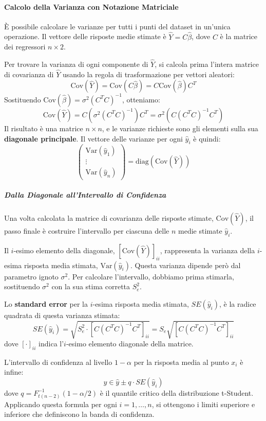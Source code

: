 \paragraph{Calcolo della Varianza con Notazione Matriciale}
È possibile calcolare le varianze per tutti i punti del dataset in un'unica
operazione. Il vettore delle risposte medie stimate è \(\hat{Y} = C
\hat{\beta}\), dove \(C\) è la matrice dei regressori \(n \times 2\).

Per trovare la varianza di ogni componente di \(\hat{Y}\), si calcola prima
l'intera matrice di covarianza di \(\hat{Y}\) usando la regola di trasformazione
per vettori aleatori:
\[
	\text{Cov}(\hat{Y}) = \text{Cov}(C \hat{\beta}) = C \text{Cov}(\hat{\beta})
	C^T
\]
Sostituendo \(\text{Cov}(\hat{\beta}) = \sigma^2 (C^T C)^{-1}\), otteniamo:
\[
	\text{Cov}(\hat{Y}) = C \left( \sigma^2 (C^T C)^{-1} \right) C^T = \sigma^2
	\left( C (C^T C)^{-1} C^T \right)
\]
Il risultato è una matrice \(n \times n\), e le varianze richieste sono gli
elementi sulla sua \textbf{diagonale principale}. Il vettore delle varianze per
ogni \(\hat{y}_i\) è quindi:
\[
	\begin{pmatrix} \text{Var}(\hat{y}_1) \\ \vdots \\ \text{Var}(\hat{y}_n)
	\end{pmatrix} = \text{diag}\left( \text{Cov}(\hat{Y}) \right)
\]

\subparagraph{Dalla Diagonale all'Intervallo di Confidenza}
Una volta calcolata la matrice di covarianza delle risposte stimate,
\(\text{Cov}(\hat{Y})\), il passo finale è costruire l'intervallo per ciascuna
delle \(n\) medie stimate \(\hat{y}_i\).

Il \(i\)-esimo elemento della diagonale, \([\text{Cov}(\hat{Y})]_{ii}\),
rappresenta la varianza della \(i\)-esima risposta media stimata,
\(\text{Var}(\hat{y}_i)\). Questa varianza dipende però dal parametro ignoto
\(\sigma^2\). Per calcolare l'intervallo, dobbiamo prima stimarla, sostituendo
\(\sigma^2\) con la sua stima corretta \(S_e^2\).

Lo \textbf{standard error} per la \(i\)-esima risposta media stimata,
\(SE(\hat{y}_i)\), è la radice quadrata di questa varianza stimata:
\[
	SE(\hat{y}_i) = \sqrt{S_e^2 \cdot \left[ C (C^T C)^{-1} C^T \right]_{ii}} =
	S_e \sqrt{\left[ C (C^T C)^{-1} C^T \right]_{ii}}
\]
dove \([ \cdot ]_{ii}\) indica l'\(i\)-esimo elemento diagonale della matrice.

L'intervallo di confidenza al livello \(1-\alpha\) per la risposta media al
punto \(x_i\) è infine:
\[
	y \in \hat{y} \pm q \cdot SE(\hat{y}_i)
\]
dove \(q = F_{t(n-2)}^{-1}(1-\alpha/2)\) è il quantile critico della
distribuzione t-Student. Applicando questa formula per ogni \(i=1, \dots, n\),
si ottengono i limiti superiore e inferiore che definiscono la banda di
confidenza.

